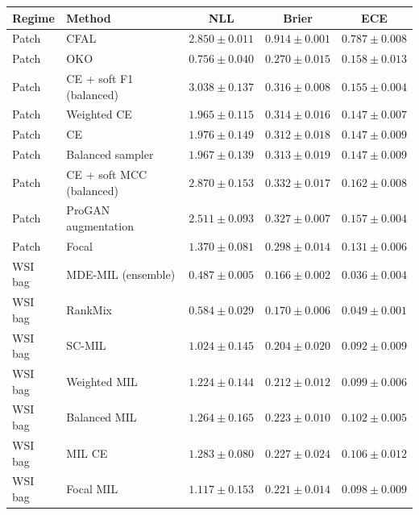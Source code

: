 \begin{tabular}{llccc}
\toprule
Regime & Method & NLL & Brier & ECE\\
\midrule
Patch & CFAL & $\num{2.850} \pm \num{0.011}$ & $\num{0.914} \pm \num{0.001}$ & $\num{0.787} \pm \num{0.008}$\\
Patch & OKO & $\num{0.756} \pm \num{0.040}$ & $\num{0.270} \pm \num{0.015}$ & $\num{0.158} \pm \num{0.013}$\\
Patch & CE + soft F1 (balanced) & $\num{3.038} \pm \num{0.137}$ & $\num{0.316} \pm \num{0.008}$ & $\num{0.155} \pm \num{0.004}$\\
Patch & Weighted CE & $\num{1.965} \pm \num{0.115}$ & $\num{0.314} \pm \num{0.016}$ & $\num{0.147} \pm \num{0.007}$\\
Patch & CE & $\num{1.976} \pm \num{0.149}$ & $\num{0.312} \pm \num{0.018}$ & $\num{0.147} \pm \num{0.009}$\\
Patch & Balanced sampler & $\num{1.967} \pm \num{0.139}$ & $\num{0.313} \pm \num{0.019}$ & $\num{0.147} \pm \num{0.009}$\\
Patch & CE + soft MCC (balanced) & $\num{2.870} \pm \num{0.153}$ & $\num{0.332} \pm \num{0.017}$ & $\num{0.162} \pm \num{0.008}$\\
Patch & ProGAN augmentation & $\num{2.511} \pm \num{0.093}$ & $\num{0.327} \pm \num{0.007}$ & $\num{0.157} \pm \num{0.004}$\\
Patch & Focal & $\num{1.370} \pm \num{0.081}$ & $\num{0.298} \pm \num{0.014}$ & $\num{0.131} \pm \num{0.006}$\\
\addlinespace
WSI bag & MDE-MIL (ensemble) & $\num{0.487} \pm \num{0.005}$ & $\num{0.166} \pm \num{0.002}$ & $\num{0.036} \pm \num{0.004}$\\
WSI bag & RankMix & $\num{0.584} \pm \num{0.029}$ & $\num{0.170} \pm \num{0.006}$ & $\num{0.049} \pm \num{0.001}$\\
WSI bag & SC-MIL & $\num{1.024} \pm \num{0.145}$ & $\num{0.204} \pm \num{0.020}$ & $\num{0.092} \pm \num{0.009}$\\
WSI bag & Weighted MIL & $\num{1.224} \pm \num{0.144}$ & $\num{0.212} \pm \num{0.012}$ & $\num{0.099} \pm \num{0.006}$\\
WSI bag & Balanced MIL & $\num{1.264} \pm \num{0.165}$ & $\num{0.223} \pm \num{0.010}$ & $\num{0.102} \pm \num{0.005}$\\
WSI bag & MIL CE & $\num{1.283} \pm \num{0.080}$ & $\num{0.227} \pm \num{0.024}$ & $\num{0.106} \pm \num{0.012}$\\
WSI bag & Focal MIL & $\num{1.117} \pm \num{0.153}$ & $\num{0.221} \pm \num{0.014}$ & $\num{0.098} \pm \num{0.009}$\\
\bottomrule
\end{tabular}
